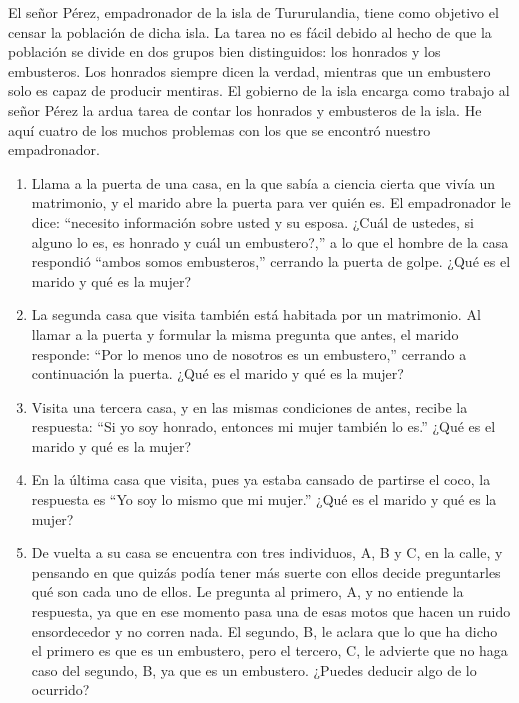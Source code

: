 \begin{ejercicio}\label{ej:1.4}
    El señor Pérez, empadronador de la isla de Tururulandia, tiene como objetivo el censar la población de dicha isla. La tarea no es fácil debido al hecho de que la población se divide en dos grupos bien distinguidos: los honrados y los embusteros. Los honrados siempre dicen la verdad, mientras que un embustero solo es capaz de producir mentiras. El gobierno de la isla encarga como trabajo al señor Pérez la ardua tarea de contar los honrados y embusteros de la isla.
    He aquí cuatro de los muchos problemas con los que se encontró nuestro empadronador.
    \begin{enumerate}
        \item Llama a la puerta de una casa, en la que sabía a ciencia cierta que vivía un matrimonio, y el marido abre la puerta para ver quién es. El empadronador le dice: ``necesito información sobre usted y su esposa. ¿Cuál de ustedes, si alguno lo es, es honrado y cuál un embustero?,'' a lo que el hombre de la casa respondió ``ambos somos embusteros,'' cerrando la puerta de golpe. ¿Qué es el marido y qué es la mujer?
        \item La segunda casa que visita también está habitada por un matrimonio. Al llamar a la puerta y formular la misma pregunta que antes, el marido responde: ``Por lo menos uno de nosotros es un embustero,'' cerrando a continuación la puerta. ¿Qué es el marido y qué es la mujer?
        \item Visita una tercera casa, y en las mismas condiciones de antes, recibe la respuesta: ``Si yo soy honrado, entonces mi mujer también lo es.'' ¿Qué es el marido y qué es la mujer?
        \item En la última casa que visita, pues ya estaba cansado de partirse el coco, la respuesta es ``Yo soy lo mismo que mi mujer.'' ¿Qué es el marido y qué es la mujer?
        \item De vuelta a su casa se encuentra con tres individuos, A, B y C, en la calle, y pensando en que quizás podía tener más suerte con ellos decide preguntarles qué son cada uno de ellos. Le pregunta al primero, A, y no entiende la respuesta, ya que en ese momento pasa una de esas motos que hacen un ruido ensordecedor y no corren nada. El segundo, B, le aclara que lo que ha dicho el primero es que es un embustero, pero el tercero, C, le advierte que no haga caso del segundo, B, ya que es un embustero. ¿Puedes deducir algo de lo ocurrido?
    \end{enumerate}
\end{ejercicio}

